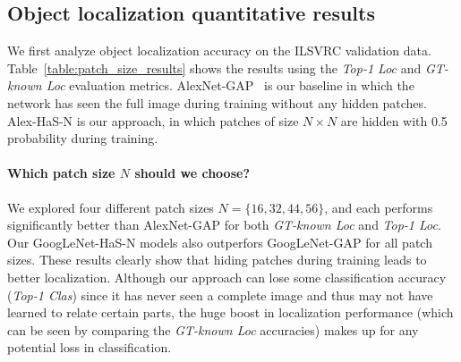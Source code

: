 \subsection{Object localization quantitative results}

We first analyze object localization accuracy on the ILSVRC validation data. Table~\ref{table:patch_size_results} shows the results using the \emph{Top-1 Loc} and \emph{GT-known Loc} evaluation metrics.  AlexNet-GAP~\cite{zhou-cvpr2016} is our baseline in which the network has seen the full image during training without any hidden patches. Alex-HaS-N is our approach, in which patches of size $N \times N$ are hidden with 0.5 probability during training.

\vspace{-10pt}
\paragraph{Which patch size $N$ should we choose?} We explored four different patch sizes $N = \{16, 32, 44, 56\}$, and each performs significantly better than AlexNet-GAP for both \emph{GT-known Loc} and \emph{Top-1 Loc}. Our GoogLeNet-HaS-N models also outperfors GoogLeNet-GAP for all patch sizes.  These results clearly show that hiding patches during training leads to better localization. Although our approach can lose some classification accuracy (\emph{Top-1 Clas}) since it has never seen a complete image and thus may not have learned to relate certain parts, the huge boost in localization performance (which can be seen by comparing the \emph{GT-known Loc} accuracies) makes up for any potential loss in classification.


